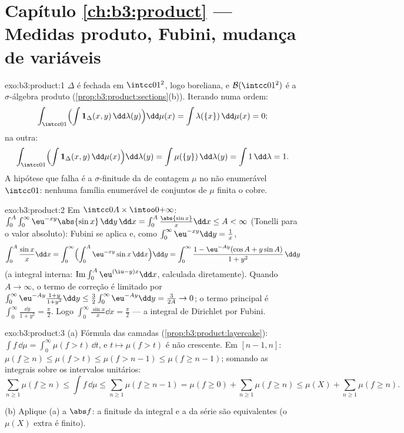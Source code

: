 \section*{Capítulo \ref{ch:b3:product} --- Medidas produto,
Fubini, mudança de variáveis}

\begin{solution}{exo:b3:product:1}
$\Delta$ é fechada em $\intcc01^2$, logo boreliana, e $\mathcal
B(\intcc01^2)$ é a $\sigma$-álgebra produto
(\cref{prop:b3:product:sections}(b)). Iterando numa ordem:
\[
\int_{\intcc01}\Bigl(\int \mathbf 1_\Delta(x,y)
\,\dd\lambda(y)\Bigr)\dd\mu(x)
= \int \lambda(\{x\})\,\dd\mu(x) = 0 ;
\]
na outra:
\[
\int_{\intcc01}\Bigl(\int\mathbf
1_\Delta(x,y)\,\dd\mu(x)\Bigr)\dd\lambda(y)
= \int \mu(\{y\})\,\dd\lambda(y) = \int 1\,\dd\lambda = 1 .
\]
A hipótese que falha é a $\sigma$-finitude da  de contagem
$\mu$ no não enumerável $\intcc01$: nenhuma família
enumerável de conjuntos de $\mu$ finita o cobre.
\end{solution}

\begin{solution}{exo:b3:product:2}
Em $\intcc0A\times\intoo0{+\infty}$:
$\int_0^A\int_0^\infty\eu^{-xy}\abs{\sin x}\,\dd y\,\dd x =
\int_0^A\frac{\abs{\sin x}}x\dd x \leq A < \infty$ (Tonelli para
o valor absoluto): Fubini se aplica e, como
$\int_0^\infty\eu^{-xy}\dd y = \frac1x$,
\[
\int_0^A\frac{\sin x}x\dd x
= \int_0^\infty\Bigl(\int_0^A\eu^{-xy}\sin x\,\dd
x\Bigr)\dd y
= \int_0^\infty \frac{1 - \eu^{-Ay}(\cos A + y\sin A)}{1 +
y^2}\,\dd y
\]
(a integral interna: $\operatorname{Im}\int_0^A\eu^{(\iu -
y)x}\dd x$, calculada diretamente). Quando $A \to \infty$, o
termo de correção é limitado por $\int_0^\infty\eu^{-Ay}\frac{1 +
y}{1 + y^2}\dd y \leq \frac32\int_0^\infty\eu^{-Ay}\dd y =
\frac3{2A} \to 0$; o termo principal é
$\int_0^\infty\frac{\dd y}{1+y^2} = \frac\pi2$. Logo
$\int_0^\infty\frac{\sin x}x\dd x = \frac\pi2$ --- a integral de Dirichlet
por Fubini.
\end{solution}

\begin{solution}{exo:b3:product:3}
(a) Fórmula das camadas (\cref{prop:b3:product:layercake}): $\int
f\,\dd\mu = \int_0^\infty\mu(f > t)\,\dd t$, e $t \mapsto
\mu(f > t)$ é não crescente. Em $[n-1, n]$: $\mu(f \geq n)
\leq \mu(f > t) \leq \mu(f > n - 1) \leq \mu(f \geq n - 1)$;
somando as integrais sobre os intervalos unitários:
\[
\sum_{n\geq1}\mu(f \geq n) \leq \int f\,\dd\mu \leq
\sum_{n\geq1}\mu(f \geq n - 1) = \mu(f \geq 0) +
\sum_{n\geq1}\mu(f\geq n) \leq \mu(X) + \sum_{n\geq1}\mu(f\geq
n).
\]

(b) Aplique (a) a $\abs f$: a finitude da integral e a da
série são equivalentes (o $\mu(X)$ extra é finito).
\end{solution}


